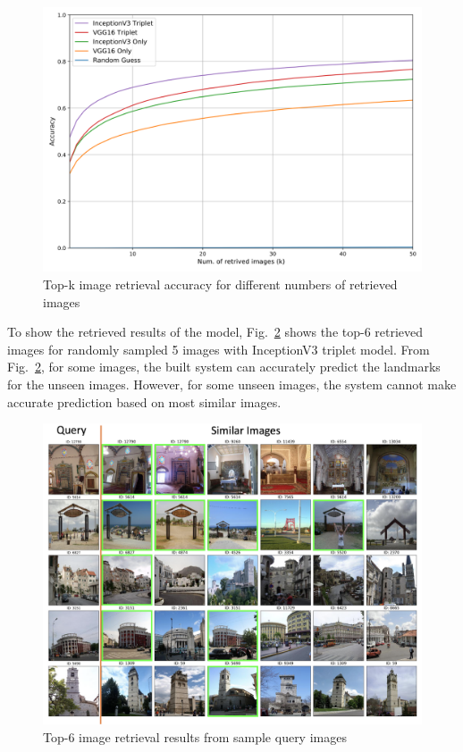 \documentclass[final,3p]{elsarticle}
\begin{document}
\begin{figure}[h]
\centering\includegraphics[width=0.7\linewidth]{./figures/accuracy.png}
\caption{Top-k image retrieval accuracy for different numbers of retrieved images}
\label{fig:accuracy}
\end{figure}

To show the retrieved results of the model, Fig.~\ref{fig:result} shows the top-6 retrieved images for randomly sampled 5 images with InceptionV3 triplet model. From Fig.~\ref{fig:result}, for some images, the built system can accurately predict the landmarks for the unseen images. However, for some unseen images, the system cannot make accurate prediction based on most similar images.

\begin{figure}[h]
\centering\includegraphics[width=1.0\linewidth]{./figures/result.png}
\caption{Top-6 image retrieval results from sample query images}
\label{fig:result}
\end{figure}
\end{document}
